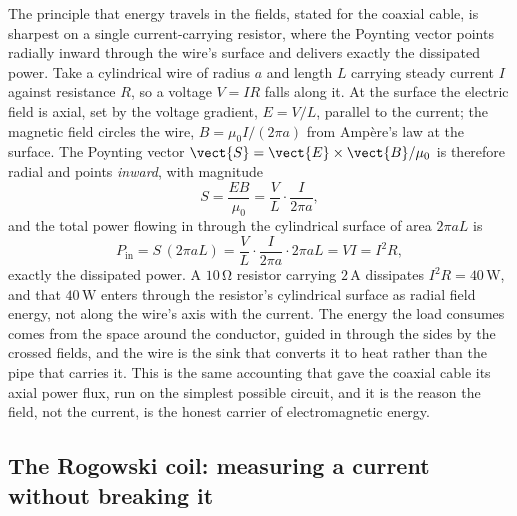 The principle that energy travels in the fields, stated for the coaxial cable,
is sharpest on a single current-carrying resistor, where the Poynting vector
points radially inward through the wire's surface and delivers exactly the
dissipated power. Take a cylindrical wire of radius $a$ and length $L$
carrying steady current $I$ against resistance $R$, so a voltage $V = IR$
falls along it. At the surface the electric field is axial, set by the
voltage gradient, $E = V/L$, parallel to the current; the magnetic field
circles the wire, $B = \mu_0 I/(2\pi a)$ from Amp\`ere's law at the surface.
The Poynting vector $\vect{S} = \vect{E}\times\vect{B}/\mu_0$ is therefore
radial and points \emph{inward}, with magnitude
\[
S = \frac{E B}{\mu_0} = \frac{V}{L}\cdot\frac{I}{2\pi a},
\]
and the total power flowing in through the cylindrical surface of area
$2\pi a L$ is
\[
P_{\text{in}} = S\,(2\pi a L) = \frac{V}{L}\cdot\frac{I}{2\pi a}\cdot 2\pi a L
= VI = I^{2}R,
\]
exactly the dissipated power. A $10\,\si{\ohm}$ resistor carrying $2\,\si{
\ampere}$ dissipates $I^{2}R = 40\,\si{\watt}$, and that $40\,\si{\watt}$
enters through the resistor's cylindrical surface as radial field energy, not
along the wire's axis with the current. The energy the load consumes comes
from the space around the conductor, guided in through the sides by the
crossed fields, and the wire is the sink that converts it to heat rather than
the pipe that carries it. This is the same accounting that gave the coaxial
cable its axial power flux, run on the simplest possible circuit, and it is
the reason the field, not the current, is the honest carrier of
electromagnetic energy.

\subsection{The Rogowski coil: measuring a current without breaking it}

